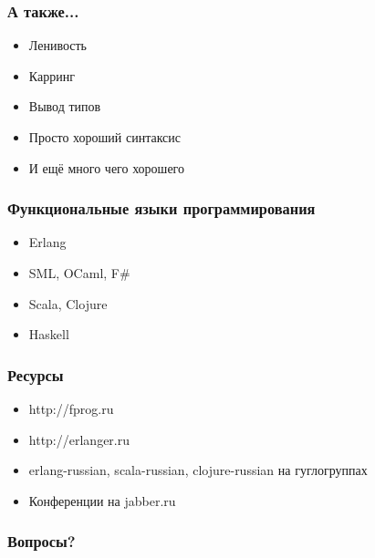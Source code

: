 \documentclass{beamer}
\begin{document}
\begin{frame}
  \frametitle{А также...}
  \begin{itemize}
  \item Ленивость
    \pause
  \item Карринг
    \pause
  \item Вывод типов
    \pause
  \item Просто хороший синтаксис
    \pause
  \item И ещё много чего хорошего
  \end{itemize}
\end{frame}

\begin{frame}
  \frametitle{Функциональные языки программирования}
  \begin{itemize}
  \item Erlang
    \pause
  \item SML, OCaml, F\#
    \pause
  \item Scala, Clojure
    \pause
  \item Haskell
  \end{itemize}
\end{frame}

\begin{frame}
  \frametitle{Ресурсы}
  \begin{itemize}
  \item http://fprog.ru
  \item http://erlanger.ru
  \item erlang-russian, scala-russian, clojure-russian на гуглогруппах
  \item Конференции на jabber.ru
  \end{itemize}
\end{frame}



\begin{frame}
  \frametitle{Вопросы?}
  \titlepage
\end{frame}
\end{document}
